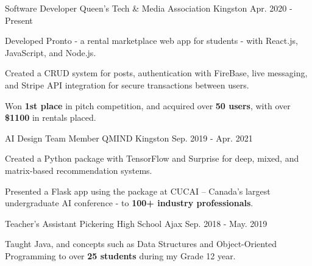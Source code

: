 

\begin{cventries}

  \cventry
    {Software Developer} %
    {Queen’s Tech \& Media Association} %
    {Kingston} %
    {Apr. 2020 - Present} %
    {
      \begin{cvitems} %
        \item {Developed Pronto - a rental marketplace web app for students - with React.js, JavaScript, and Node.js.}
        \item {Created a CRUD system for posts, authentication with FireBase, live messaging, and Stripe API integration for secure transactions between users.}
        \item {Won \textbf{1st place} in pitch competition, and acquired over \textbf{50 users}, with over \textbf{\$1100} in rentals placed.}
      \end{cvitems}
    }

  \cventry
    {AI Design Team Member} %
    {QMIND} %
    {Kingston} %
    {Sep. 2019 - Apr. 2021} %
    {
      \begin{cvitems} %
        \item {Created a Python package with TensorFlow and Surprise for deep, mixed, and matrix-based recommendation systems.}
        \item {Presented a Flask app using the package at CUCAI – Canada’s largest undergraduate AI conference - to \textbf{100+ industry professionals}.}
      \end{cvitems}
    }

  \cventry
    {Teacher's Assistant} %
    {Pickering High School} %
    {Ajax} %
    {Sep. 2018 - May. 2019} %
    {
      \begin{cvitems} %
        \item {Taught Java, and concepts such as Data Structures and Object-Oriented Programming to over \textbf{25 students} during my Grade 12 year.}
      \end{cvitems}
    }


\end{cventries}
